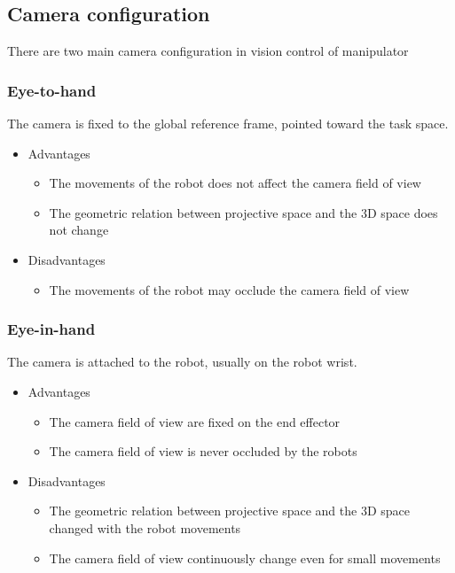 \subsection{Camera configuration}

There are two main camera configuration in vision control of manipulator

\subsubsection{Eye-to-hand}

The camera is fixed to the global reference frame, pointed toward the task space.

\begin{itemize}
	\item Advantages
	\begin{itemize}
		\item The movements of the robot does not affect the camera field of view
		\item The geometric relation between projective space and the 3D space does not change
	\end{itemize}

	\item Disadvantages
	\begin{itemize}
		\item The movements of the robot may occlude the camera field of view
	\end{itemize}
\end{itemize}

\subsubsection{Eye-in-hand}

The camera is attached to the robot, usually on the robot wrist.

\begin{itemize}
	\item Advantages
	\begin{itemize}
		\item The camera field of view are fixed on the end effector
		\item The camera field of view is never occluded by the robots
	\end{itemize}

	\item Disadvantages
	\begin{itemize}
		\item The geometric relation between projective space and the 3D space changed with the robot movements
		\item The camera field of view continuously change even for small movements
	\end{itemize}
\end{itemize}

